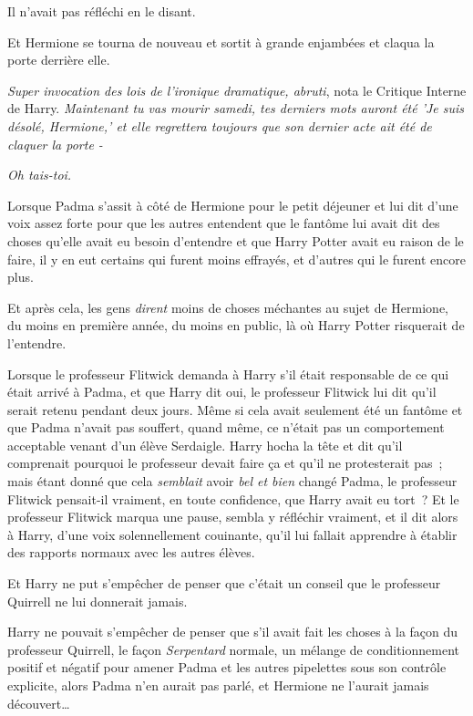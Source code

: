 Il n'avait pas réfléchi en le disant.

Et Hermione se tourna de nouveau et sortit à grande enjambées et claqua la porte derrière elle.

\emph{Super invocation des lois de l'ironique dramatique, abruti}, nota le Critique Interne de Harry. \emph{Maintenant tu vas mourir samedi, tes derniers mots auront été 'Je suis désolé, Hermione,' et elle regrettera toujours que son dernier acte ait été de claquer la porte -}

\emph{Oh tais-toi.}

\later

Lorsque Padma s'assit à côté de Hermione pour le petit déjeuner et lui dit d'une voix assez forte pour que les autres entendent que le fantôme lui avait dit des choses qu'elle avait eu besoin d'entendre et que Harry Potter avait eu raison de le faire, il y en eut certains qui furent moins effrayés, et d'autres qui le furent encore plus.

Et après cela, les gens \emph{dirent} moins de choses méchantes au sujet de Hermione, du moins en première année, du moins en public, là où Harry Potter risquerait de l'entendre.

Lorsque le professeur Flitwick demanda à Harry s'il était responsable de ce qui était arrivé à Padma, et que Harry dit oui, le professeur Flitwick lui dit qu'il serait retenu pendant deux jours. Même si cela avait seulement été un fantôme et que Padma n'avait pas souffert, quand même, ce n'était pas un comportement acceptable venant d'un élève Serdaigle. Harry hocha la tête et dit qu'il comprenait pourquoi le professeur devait faire ça et qu'il ne protesterait pas~; mais étant donné que cela \emph{semblait} avoir \emph{bel et bien} changé Padma, le professeur Flitwick pensait-il vraiment, en toute confidence, que Harry avait eu tort~? Et le professeur Flitwick marqua une pause, sembla y réfléchir vraiment, et il dit alors à Harry, d'une voix solennellement couinante, qu'il lui fallait apprendre à établir des rapports normaux avec les autres élèves.

Et Harry ne put s'empêcher de penser que c'était un conseil que le professeur Quirrell ne lui donnerait jamais.

Harry ne pouvait s'empêcher de penser que s'il avait fait les choses à la façon du professeur Quirrell, le façon \emph{Serpentard} normale, un mélange de conditionnement positif et négatif pour amener Padma et les autres pipelettes sous son contrôle explicite, alors Padma n'en aurait pas parlé, et Hermione ne l'aurait jamais découvert…

